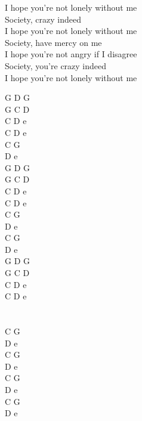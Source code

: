 \documentclass[a5paper, 10pt]{book}
\begin{document}
\begin{minipage}[t]{0.9\textwidth}
\hspace*{5mm}I hope you're not lonely without me\\
\hspace*{5mm}Society, crazy indeed\\
\hspace*{5mm}I hope you're not lonely without me\\
\hspace*{5mm}Society, have mercy on me\\
\hspace*{5mm}I hope you're not angry if I disagree\\
\hspace*{5mm}Society, you're crazy indeed\\
\hspace*{5mm}I hope you're not lonely without me\\
\end{minipage}
\begin{minipage}[t]{0.1\textwidth}
G D G\\
G C D\\
C D e\\
C D e\\

C G\\
D e\\

G D G\\
G C D\\
C D e\\
C D e\\

C G\\
D e\\
C G\\
D e\\

G D G\\
G C D\\
C D e\\
C D e\\
\\
\\
C G\\
D e\\
C G\\
D e\\
C G\\
D e\\
C G\\
D e\\

\end{minipage}
\end{document}
